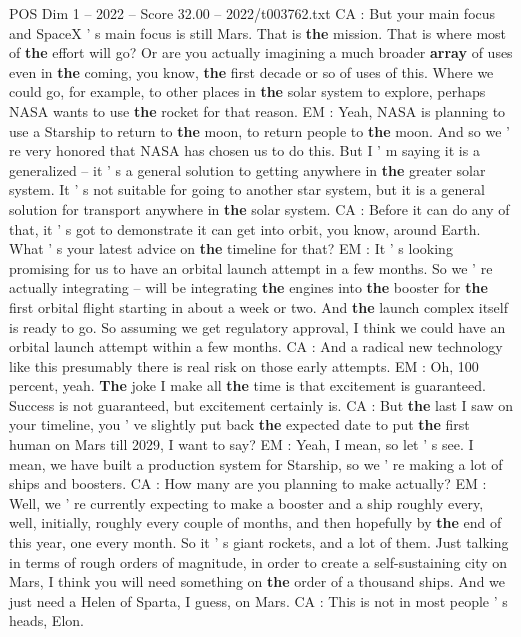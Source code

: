 \begin{textsample}{POS Dim 1 – 2022 – Score 32.00 – 2022/t003762.txt}
CA : But your main focus and SpaceX ' s main focus is still Mars.
That is \textbf{the} mission.
That is where most of \textbf{the} effort will go?
Or are you actually imagining a much broader \textbf{array} of uses even in \textbf{the} coming, you know, \textbf{the} first decade or so of uses of this.
Where we could go, for example, to other places in \textbf{the} solar system to explore, perhaps NASA wants to use \textbf{the} rocket for that reason.
EM : Yeah, NASA is planning to use a Starship to return to \textbf{the} moon, to return people to \textbf{the} moon.
And so we ' re very honored that NASA has chosen us to do this.
But I ' m saying it is a generalized -- it ' s a general solution to getting anywhere in \textbf{the} greater solar system.
It ' s not suitable for going to another star system, but it is a general solution for transport anywhere in \textbf{the} solar system.
CA : Before it can do any of that, it ' s got to demonstrate it can get into orbit, you know, around Earth.
What ' s your latest advice on \textbf{the} timeline for that?
EM : It ' s looking promising for us to have an orbital launch attempt in a few months.
So we ' re actually integrating -- will be integrating \textbf{the} engines into \textbf{the} booster for \textbf{the} first orbital flight starting in about a week or two.
And \textbf{the} launch complex itself is ready to go.
So assuming we get regulatory approval, I think we could have an orbital launch attempt within a few months.
CA : And a radical new technology like this presumably there is real risk on those early attempts.
EM : Oh, 100 percent, yeah. \textbf{The} joke I make all \textbf{the} time is that excitement is guaranteed.
Success is not guaranteed, but excitement certainly is.
CA : But \textbf{the} last I saw on your timeline, you ' ve slightly put back \textbf{the} expected date to put \textbf{the} first human on Mars till 2029, I want to say?
EM : Yeah, I mean, so let ' s see.
I mean, we have built a production system for Starship, so we ' re making a lot of ships and boosters.
CA : How many are you planning to make actually?
EM : Well, we ' re currently expecting to make a booster and a ship roughly every, well, initially, roughly every couple of months, and then hopefully by \textbf{the} end of this year, one every month.
So it ' s giant rockets, and a lot of them.
Just talking in terms of rough orders of magnitude, in order to create a self-sustaining city on Mars, I think you will need something on \textbf{the} order of a thousand ships.
And we just need a Helen of Sparta, I guess, on Mars.
CA : This is not in most people ' s heads, Elon.

\end{textsample}
